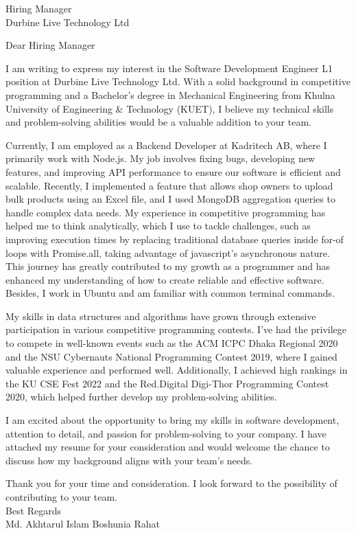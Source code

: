 \documentclass[a4paper,11pt]{letter}
\date{November 11, 2024} %
\begin{document}
\begin{letter}{Hiring Manager \\ Durbine Live Technology Ltd}

\opening
{Dear Hiring Manager}

I am writing to express my interest in the Software Development Engineer L1 position at Durbine Live Technology Ltd. With a solid background in competitive programming and a Bachelor’s degree in Mechanical Engineering from Khulna University of Engineering \& Technology (KUET), I believe my technical skills and problem-solving abilities would be a valuable addition to your team.

Currently, I am employed as a Backend Developer at Kadritech AB, where I primarily work with Node.js. My job involves fixing bugs, developing new features, and improving API performance to ensure our software is efficient and scalable. Recently, I implemented a feature that allows shop owners to upload bulk products using an Excel file, and I used MongoDB aggregation queries to handle complex data needs. My experience in competitive programming has helped me to think analytically, which I use to tackle challenges, such as improving execution times by replacing traditional database queries inside for-of loops with Promise.all, taking advantage of javascript's asynchronous nature. This journey has greatly contributed to my growth as a programmer and has enhanced my understanding of how to create reliable and effective software. Besides, I work in Ubuntu and am familiar with common terminal commands.

My skills in data structures and algorithms have grown through extensive participation in various competitive programming contests. I’ve had the privilege to compete in well-known events such as the ACM ICPC Dhaka Regional 2020 and the NSU Cybernauts National Programming Contest 2019, where I gained valuable experience and performed well. Additionally, I achieved high rankings in the KU CSE Fest 2022 and the Red.Digital Digi-Thor Programming Contest 2020, which helped further develop my problem-solving abilities.


I am excited about the opportunity to bring my skills in software development, attention to detail, and passion for problem-solving to your company. I have attached my resume for your consideration and would welcome the chance to discuss how my background aligns with your team’s needs.

Thank you for your time and consideration. I look forward to the possibility of contributing to your team.\\

Best Regards\\
Md. Akhtarul Islam Boshunia Rahat

\end{letter}
\end{document}
